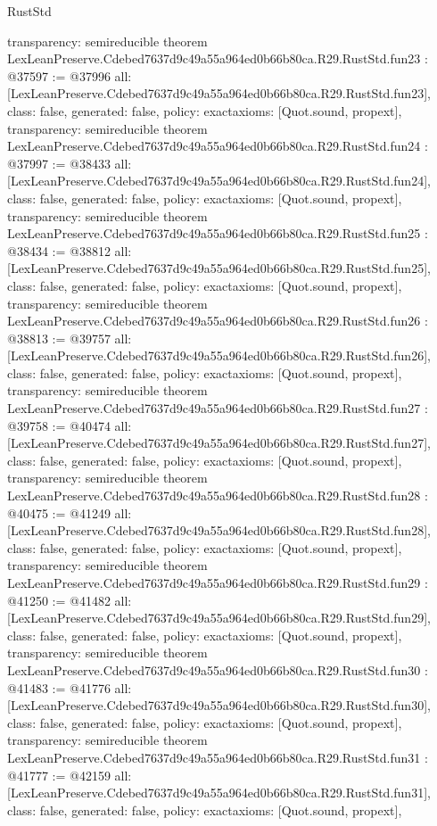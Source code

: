 \begin{lexlean}{RustStd}
\begin{coremodule}
{  transparency: semireducible
}
theorem LexLeanPreserve.Cdebed7637d9c49a55a964ed0b66b80ca.R29.RustStd.fun23 : @37597 := @37996 {
  all: [LexLeanPreserve.Cdebed7637d9c49a55a964ed0b66b80ca.R29.RustStd.fun23],
  class: false,
  generated: false,
  policy: exact{axioms: [Quot.sound, propext]},
  transparency: semireducible
}
theorem LexLeanPreserve.Cdebed7637d9c49a55a964ed0b66b80ca.R29.RustStd.fun24 : @37997 := @38433 {
  all: [LexLeanPreserve.Cdebed7637d9c49a55a964ed0b66b80ca.R29.RustStd.fun24],
  class: false,
  generated: false,
  policy: exact{axioms: [Quot.sound, propext]},
  transparency: semireducible
}
theorem LexLeanPreserve.Cdebed7637d9c49a55a964ed0b66b80ca.R29.RustStd.fun25 : @38434 := @38812 {
  all: [LexLeanPreserve.Cdebed7637d9c49a55a964ed0b66b80ca.R29.RustStd.fun25],
  class: false,
  generated: false,
  policy: exact{axioms: [Quot.sound, propext]},
  transparency: semireducible
}
theorem LexLeanPreserve.Cdebed7637d9c49a55a964ed0b66b80ca.R29.RustStd.fun26 : @38813 := @39757 {
  all: [LexLeanPreserve.Cdebed7637d9c49a55a964ed0b66b80ca.R29.RustStd.fun26],
  class: false,
  generated: false,
  policy: exact{axioms: [Quot.sound, propext]},
  transparency: semireducible
}
theorem LexLeanPreserve.Cdebed7637d9c49a55a964ed0b66b80ca.R29.RustStd.fun27 : @39758 := @40474 {
  all: [LexLeanPreserve.Cdebed7637d9c49a55a964ed0b66b80ca.R29.RustStd.fun27],
  class: false,
  generated: false,
  policy: exact{axioms: [Quot.sound, propext]},
  transparency: semireducible
}
theorem LexLeanPreserve.Cdebed7637d9c49a55a964ed0b66b80ca.R29.RustStd.fun28 : @40475 := @41249 {
  all: [LexLeanPreserve.Cdebed7637d9c49a55a964ed0b66b80ca.R29.RustStd.fun28],
  class: false,
  generated: false,
  policy: exact{axioms: [Quot.sound, propext]},
  transparency: semireducible
}
theorem LexLeanPreserve.Cdebed7637d9c49a55a964ed0b66b80ca.R29.RustStd.fun29 : @41250 := @41482 {
  all: [LexLeanPreserve.Cdebed7637d9c49a55a964ed0b66b80ca.R29.RustStd.fun29],
  class: false,
  generated: false,
  policy: exact{axioms: [Quot.sound, propext]},
  transparency: semireducible
}
theorem LexLeanPreserve.Cdebed7637d9c49a55a964ed0b66b80ca.R29.RustStd.fun30 : @41483 := @41776 {
  all: [LexLeanPreserve.Cdebed7637d9c49a55a964ed0b66b80ca.R29.RustStd.fun30],
  class: false,
  generated: false,
  policy: exact{axioms: [Quot.sound, propext]},
  transparency: semireducible
}
theorem LexLeanPreserve.Cdebed7637d9c49a55a964ed0b66b80ca.R29.RustStd.fun31 : @41777 := @42159 {
  all: [LexLeanPreserve.Cdebed7637d9c49a55a964ed0b66b80ca.R29.RustStd.fun31],
  class: false,
  generated: false,
  policy: exact{axioms: [Quot.sound, propext]},
}
\end{coremodule}
\end{lexlean}
